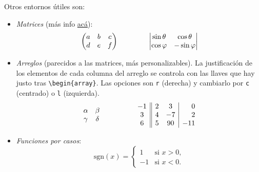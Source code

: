 \documentclass[12pt, spanish]{article}
\theoremstyle{definition} %
\theoremstyle{remark} %
\theoremstyle{plain} %
\theoremstyle{plain} %
\theoremstyle{plain} %
\theoremstyle{plain} %
\theoremstyle{plain} %
\theoremstyle{remark} %
\newcommand{\sgn}[0]{\mathrm{sgn}} %
\begin{document}
Otros entornos útiles son:
\begin{itemize}
    \item \textit{Matrices} (más info \href{www.overleaf.com/learn/latex/Matrices}{acá}):
    \[
        \begin{pmatrix}
        a & b & c\\
        d & e & f
        \end{pmatrix}\hspace{1.5cm}
        \begin{vmatrix}
        \sin\theta & \cos\theta\\
        \cos\varphi & -\sin\varphi
        \end{vmatrix}
    \]
    \item \textit{Arreglos} (parecidos a las matrices, más personalizables). La justificación de los elementos de cada columna del arreglo se controla con las llaves que hay justo tras \verb|\begin{array}|. Las opciones son \verb|r| (derecha) y cambiarlo por \verb|c| (centrado) o \verb|l| (izquierda).
    \[
      \begin{array}{cc}
        \alpha & \beta \\
         \gamma & \delta
      \end{array}\hspace{1.5cm}
      \begin{array}{c||cc|r}
        -1 & 2 &  3 &   0 \\
         3 & 4 & -7 &   2\\
         6 & 5 & 90 & -11
      \end{array}
    \]
    \item \textit{Funciones por casos}:
    \[
        \sgn(x) = \begin{cases}
            1& \text{si $x > 0$},\\
            -1& \text{si $x < 0$}.
        \end{cases}
    \]
\end{itemize}
\end{document}
